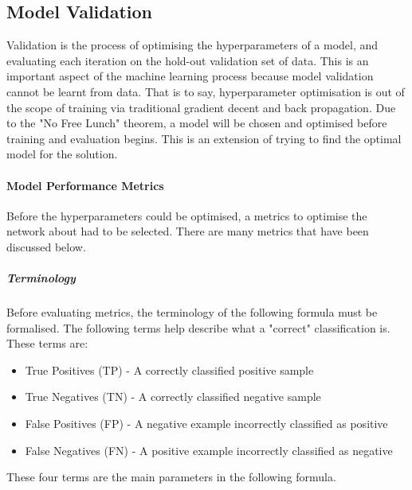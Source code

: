 \documentclass{UoNMCHA}
\numberwithin{equation}{section}
\begin{document}


\subsection{Model Validation}\label{subsec:ModelVal}
Validation is the process of optimising the hyperparameters of a model, and evaluating each iteration on the hold-out validation set of data. This is an important aspect of the machine learning process because model validation cannot be learnt from data. That is to say, hyperparameter optimisation is out of the scope of training via traditional gradient decent and back propagation. Due to the "No Free Lunch" theorem, a model will be chosen and optimised before training and evaluation begins. This is an extension of trying to find the optimal model for the solution. 

\paragraph{Model Performance Metrics}
Before the hyperparameters could be optimised, a metrics to optimise the network about had to be selected. There are many metrics that have been discussed below. \\

\subparagraph{Terminology} 
Before evaluating metrics, the terminology of the following formula must be formalised. The following terms help describe what a "correct" classification is. These terms are:
\begin{itemize}
    \item True Positives (TP) - A correctly classified positive sample
    \item True Negatives (TN) - A correctly classified negative sample
    \item False Positives (FP) - A negative example incorrectly classified as positive
    \item False Negatives (FN) - A positive example incorrectly classified as negative
\end{itemize}

These four terms are the main parameters in the following formula.
\end{document}
